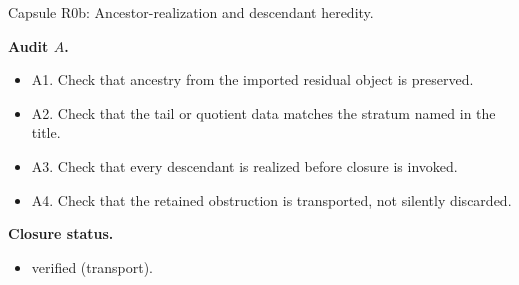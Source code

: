 \documentclass[11pt]{amsart}
\newcommand{\capsulefield}[1]{\par\smallskip\noindent\textbf{#1.}\ }
\begin{document}
\begin{proofcapsule}{Capsule R0b: Ancestor-realization and descendant heredity.}
  \capsulefield{Audit \(A\)}
  \begin{itemize}[leftmargin=1.8em]
  \item A1. Check that ancestry from the imported residual object is preserved.
  \item A2. Check that the tail or quotient data matches the stratum named in the title.
  \item A3. Check that every descendant is realized before closure is invoked.
  \item A4. Check that the retained obstruction is transported, not silently discarded.
  \end{itemize}
  \capsulefield{Closure status}
  \begin{itemize}[leftmargin=1.8em]
  \item verified (transport).
  \end{itemize}
\end{proofcapsule}
\end{document}
